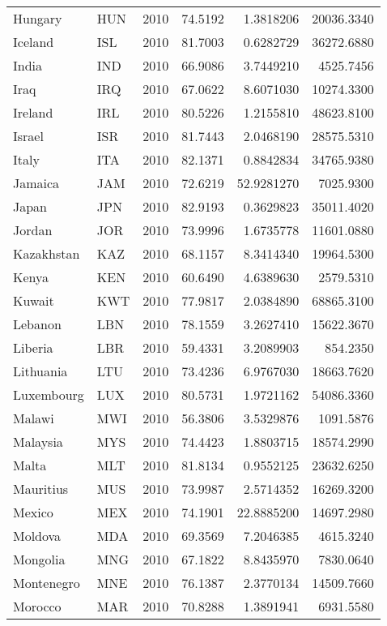 \begin{longtable}[t]{llrrrr}
\addlinespace
Hungary & HUN & 2010 & 74.5192 & 1.3818206 & 20036.3340\\
Iceland & ISL & 2010 & 81.7003 & 0.6282729 & 36272.6880\\
India & IND & 2010 & 66.9086 & 3.7449210 & 4525.7456\\
Iraq & IRQ & 2010 & 67.0622 & 8.6071030 & 10274.3300\\
Ireland & IRL & 2010 & 80.5226 & 1.2155810 & 48623.8100\\
\addlinespace
Israel & ISR & 2010 & 81.7443 & 2.0468190 & 28575.5310\\
Italy & ITA & 2010 & 82.1371 & 0.8842834 & 34765.9380\\
Jamaica & JAM & 2010 & 72.6219 & 52.9281270 & 7025.9300\\
Japan & JPN & 2010 & 82.9193 & 0.3629823 & 35011.4020\\
Jordan & JOR & 2010 & 73.9996 & 1.6735778 & 11601.0880\\
\addlinespace
Kazakhstan & KAZ & 2010 & 68.1157 & 8.3414340 & 19964.5300\\
Kenya & KEN & 2010 & 60.6490 & 4.6389630 & 2579.5310\\
Kuwait & KWT & 2010 & 77.9817 & 2.0384890 & 68865.3100\\
Lebanon & LBN & 2010 & 78.1559 & 3.2627410 & 15622.3670\\
Liberia & LBR & 2010 & 59.4331 & 3.2089903 & 854.2350\\
\addlinespace
Lithuania & LTU & 2010 & 73.4236 & 6.9767030 & 18663.7620\\
Luxembourg & LUX & 2010 & 80.5731 & 1.9721162 & 54086.3360\\
Malawi & MWI & 2010 & 56.3806 & 3.5329876 & 1091.5876\\
Malaysia & MYS & 2010 & 74.4423 & 1.8803715 & 18574.2990\\
Malta & MLT & 2010 & 81.8134 & 0.9552125 & 23632.6250\\
\addlinespace
Mauritius & MUS & 2010 & 73.9987 & 2.5714352 & 16269.3200\\
Mexico & MEX & 2010 & 74.1901 & 22.8885200 & 14697.2980\\
Moldova & MDA & 2010 & 69.3569 & 7.2046385 & 4615.3240\\
Mongolia & MNG & 2010 & 67.1822 & 8.8435970 & 7830.0640\\
Montenegro & MNE & 2010 & 76.1387 & 2.3770134 & 14509.7660\\
\addlinespace
Morocco & MAR & 2010 & 70.8288 & 1.3891941 & 6931.5580\\

\end{longtable}
